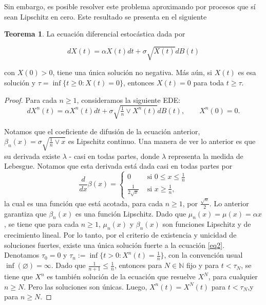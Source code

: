 \documentclass[letterpaper]{article}
\newcommand{\N}{\mathbb N}
\newcommand{\1}{\mathds{1}}
\theoremstyle{definition}
\theoremstyle{definition}
\newtheorem{teo}{Teorema}
\theoremstyle{definition}
\theoremstyle{definition}
\theoremstyle{definition}
\begin{document}
Sin embargo, es posible resolver este problema aproximando por procesos que sí sean Lipschitz en cero. Este 
resultado se presenta en el siguiente
\begin{teo}
La ecuación diferencial estocástica dada por 

\begin{equation}
    dX(t)=\alpha X(t)dt+\sigma\sqrt{X(t)}dB(t)
\end{equation}

con $X(0)>0$, tiene una única solución no negativa. Más aún, si $X(t)$ es esa solución y 
$\tau=\inf\{t\geq0 : X(t)=0\}$, entonces $X(t)=0$ para toda $t\geq\tau$.
\end{teo}
\begin{proof} 
    Para cada $n\geq1$, consideramos la siguiente EDE:
    \begin{equation}\label{eq2}
        dX^{n}(t)=\alpha X^{n}(t)dt+\sigma \sqrt{\tfrac{1}{n}\vee X^{n}(t)}dB(t), \qquad X^{n}(0)=0.    
    \end{equation}
     
    Notamos que el coeficiente de difusión de la ecuación anterior, $\beta_n(x)=\sigma\sqrt{\tfrac{1}{n}\vee x}$
    es Lipschitz continuo. Una manera de ver lo anterior es que su derivada existe $\lambda$ - casi en todas partes, donde 
    $\lambda$ representa la medida de Lebesgue. Notamos que esta derivada está dada casi en todas partes por 
    \[
    \frac{d}{dx}\beta(x)=\begin{cases}
        0 &  \text{ si } 0\leq x\leq \frac{1}{n}\\
        \frac{1}{2\sqrt{x}} & \text{ si } x\geq \frac{1}{n},
    \end{cases}    
    \]
    la cual es una función que está acotada, para cada $n\geq1$, por $\tfrac{\sqrt{n}}{2}$. Lo anterior
    garantiza que $\beta_n(x)$ es una función Lipschitz.  Dado que $\mu_n(x)=\mu(x)=\alpha x$, se tiene que 
    para cada $n\geq1$, $\mu_n(x)$ y $\beta_n(x)$ son funciones Lipschitz y de crecimiento lineal. Por lo 
    tanto, por el criterio de existencia y unicidad de soluciones fuertes, existe una única solución fuerte 
    a la ecuación \ref{eq2}.\\

    Denotamos $\tau_0=0$ y $\tau_n:=\inf\{t>0:X^{n}(t)=\tfrac{1}{n}\}$, con la convención usual 
    $\inf(\varnothing)=\infty$. Dado que $\tfrac{1}{n+1}\leq \tfrac{1}{n}$, entonces 
    para $N\in \N$ fijo y para $t<\tau_N$, se tiene que $X^{n}$ es también solución de la ecuación que resuelve $X^{N}$, para cualquier $n\geq N$. Pero 
    las soluciones son únicas. Luego, $X^{n}(t)=X^{N}(t)$ para $t<\tau_N$,y para $n\geq N$.
    \newline


\end{proof}
\end{document}
